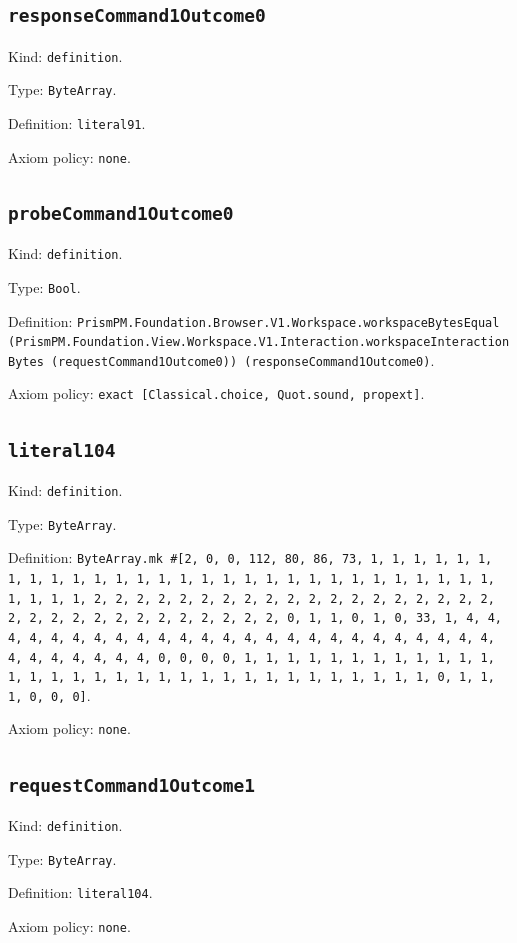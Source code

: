 \documentclass[11pt]{article}
\begin{document}
\subsection*{\texttt{responseCommand1Outcome0}}
\noindent Kind: \texttt{definition}.\par
\noindent Type: \texttt{ByteArray}.\par
\noindent Definition: \texttt{literal91}.\par
\noindent Axiom policy: \texttt{none}.\par
\subsection*{\texttt{probeCommand1Outcome0}}
\noindent Kind: \texttt{definition}.\par
\noindent Type: \texttt{Bool}.\par
\noindent Definition: \texttt{PrismPM.Foundation.Browser.V1.Workspace.workspaceBytesEqual (PrismPM.Foundation.View.Workspace.V1.Interaction.workspaceInteractionBytes (requestCommand1Outcome0)) (responseCommand1Outcome0)}.\par
\noindent Axiom policy: \texttt{exact [Classical.choice, Quot.sound, propext]}.\par
\subsection*{\texttt{literal104}}
\noindent Kind: \texttt{definition}.\par
\noindent Type: \texttt{ByteArray}.\par
\noindent Definition: \texttt{ByteArray.mk \#[2, 0, 0, 112, 80, 86, 73, 1, 1, 1, 1, 1, 1, 1, 1, 1, 1, 1, 1, 1, 1, 1, 1, 1, 1, 1, 1, 1, 1, 1, 1, 1, 1, 1, 1, 1, 1, 1, 1, 1, 2, 2, 2, 2, 2, 2, 2, 2, 2, 2, 2, 2, 2, 2, 2, 2, 2, 2, 2, 2, 2, 2, 2, 2, 2, 2, 2, 2, 2, 2, 2, 2, 0, 1, 1, 0, 1, 0, 33, 1, 4, 4, 4, 4, 4, 4, 4, 4, 4, 4, 4, 4, 4, 4, 4, 4, 4, 4, 4, 4, 4, 4, 4, 4, 4, 4, 4, 4, 4, 4, 4, 4, 0, 0, 0, 0, 1, 1, 1, 1, 1, 1, 1, 1, 1, 1, 1, 1, 1, 1, 1, 1, 1, 1, 1, 1, 1, 1, 1, 1, 1, 1, 1, 1, 1, 1, 1, 1, 0, 1, 1, 1, 0, 0, 0]}.\par
\noindent Axiom policy: \texttt{none}.\par
\subsection*{\texttt{requestCommand1Outcome1}}
\noindent Kind: \texttt{definition}.\par
\noindent Type: \texttt{ByteArray}.\par
\noindent Definition: \texttt{literal104}.\par
\noindent Axiom policy: \texttt{none}.\par
\end{document}
